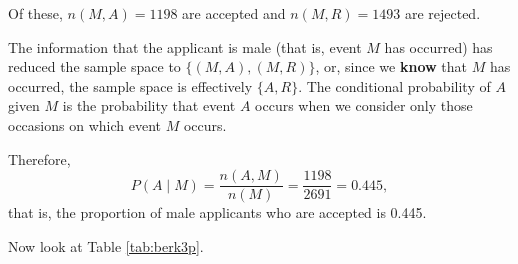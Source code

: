 \documentclass[
  11pt,
  british,
  openany, a4paper]{book}
\begin{document}
Of these, \(n(M , A) = 1198\) are accepted and \(n(M , R) = 1493\) are rejected.

The information that the applicant is male (that is, event \(M\) has occurred) has reduced the sample space to \(\{(M , A),(M , R)\}\), or, since we \textbf{know} that
\(M\) has occurred, the sample space is effectively \(\{A,R\}\). The conditional probability of \(A\) given \(M\) is the probability that event \(A\) occurs when we consider only those occasions on which event \(M\) occurs.

Therefore,
\begin{equation}
P(A \mid M) = \frac{n(A, M)}{n(M)} = \frac{1198}{2691} = 0.445,
\label{eq:freqs}
\end{equation}
that is, the proportion of male applicants who are accepted is 0.445.

Now look at Table \ref{tab:berk3p}.

 
  \providecommand{\huxb}[2]{\arrayrulecolor[RGB]{#1}\global\arrayrulewidth=#2pt}
  \providecommand{\huxvb}[2]{\color[RGB]{#1}\vrule width #2pt}
  \providecommand{\huxtpad}[1]{\rule{0pt}{#1}}
  \providecommand{\huxbpad}[1]{\rule[-#1]{0pt}{#1}}
\end{document}
